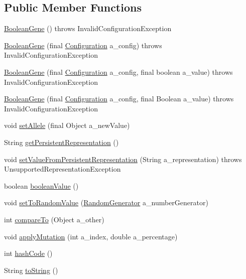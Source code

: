 \subsection*{Public Member Functions}
\begin{DoxyCompactItemize}
\item 
\hyperlink{classorg_1_1jgap_1_1impl_1_1_boolean_gene_aa3f2fb3fadb98124f1f98a84330fa6d2}{Boolean\-Gene} ()  throws Invalid\-Configuration\-Exception 
\item 
\hyperlink{classorg_1_1jgap_1_1impl_1_1_boolean_gene_a49dc542469f4b0306471491c11a69b77}{Boolean\-Gene} (final \hyperlink{classorg_1_1jgap_1_1_configuration}{Configuration} a\-\_\-config)  throws Invalid\-Configuration\-Exception 
\item 
\hyperlink{classorg_1_1jgap_1_1impl_1_1_boolean_gene_acb769537ae976c488764a996aa53df6e}{Boolean\-Gene} (final \hyperlink{classorg_1_1jgap_1_1_configuration}{Configuration} a\-\_\-config, final boolean a\-\_\-value)  throws Invalid\-Configuration\-Exception 
\item 
\hyperlink{classorg_1_1jgap_1_1impl_1_1_boolean_gene_a5837da5a107b86bf4f956339abd9780b}{Boolean\-Gene} (final \hyperlink{classorg_1_1jgap_1_1_configuration}{Configuration} a\-\_\-config, final Boolean a\-\_\-value)  throws Invalid\-Configuration\-Exception 
\item 
void \hyperlink{classorg_1_1jgap_1_1impl_1_1_boolean_gene_af8a4411701b8ebe94cc9e4ede4d392ef}{set\-Allele} (final Object a\-\_\-new\-Value)
\item 
String \hyperlink{classorg_1_1jgap_1_1impl_1_1_boolean_gene_a616c3ec92db2cc4ef9bcc6ba33b2e0a1}{get\-Persistent\-Representation} ()
\item 
void \hyperlink{classorg_1_1jgap_1_1impl_1_1_boolean_gene_a67b5e436592a8e9fa9e17a3794ec6deb}{set\-Value\-From\-Persistent\-Representation} (String a\-\_\-representation)  throws Unsupported\-Representation\-Exception 
\item 
boolean \hyperlink{classorg_1_1jgap_1_1impl_1_1_boolean_gene_aca61d17f9e53c1840bd7d08f4a6ac101}{boolean\-Value} ()
\item 
void \hyperlink{classorg_1_1jgap_1_1impl_1_1_boolean_gene_a21dd7e5973db3e3a32745d3e2e3dcbb0}{set\-To\-Random\-Value} (\hyperlink{interfaceorg_1_1jgap_1_1_random_generator}{Random\-Generator} a\-\_\-number\-Generator)
\item 
int \hyperlink{classorg_1_1jgap_1_1impl_1_1_boolean_gene_a3d7f5c0543076d1b8090a17b7935aabd}{compare\-To} (Object a\-\_\-other)
\item 
void \hyperlink{classorg_1_1jgap_1_1impl_1_1_boolean_gene_a70dea740df4046662f3c4d56205e9986}{apply\-Mutation} (int a\-\_\-index, double a\-\_\-percentage)
\item 
int \hyperlink{classorg_1_1jgap_1_1impl_1_1_boolean_gene_a9875df72d7bb5c7b1bc03fdbe0719955}{hash\-Code} ()
\item 
String \hyperlink{classorg_1_1jgap_1_1impl_1_1_boolean_gene_abf9d0e79fbf043ff7eca2d9eaee04a64}{to\-String} ()
\end{DoxyCompactItemize}
